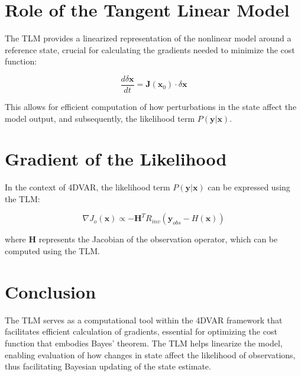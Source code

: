 \documentclass{article}
\begin{document}
\section{Role of the Tangent Linear Model}

The TLM provides a linearized representation of the nonlinear model around a reference state, crucial for calculating the gradients needed to minimize the cost function:

\[
\frac{d \delta \mathbf{x}}{dt} = \mathbf{J}(\mathbf{x}_0) \cdot \delta \mathbf{x}
\]

This allows for efficient computation of how perturbations in the state affect the model output, and subsequently, the likelihood term \( P(\mathbf{y} | \mathbf{x}) \).

\section{Gradient of the Likelihood}

In the context of 4DVAR, the likelihood term \( P(\mathbf{y} | \mathbf{x}) \) can be expressed using the TLM:

\[
\nabla J_o(\mathbf{x}) \propto -\mathbf{H}^T R_{inv} (\mathbf{y}_{obs} - H(\mathbf{x}))
\]

where \( \mathbf{H} \) represents the Jacobian of the observation operator, which can be computed using the TLM.

\section{Conclusion}

The TLM serves as a computational tool within the 4DVAR framework that facilitates efficient calculation of gradients, essential for optimizing the cost function that embodies Bayes' theorem. The TLM helps linearize the model, enabling evaluation of how changes in state affect the likelihood of observations, thus facilitating Bayesian updating of the state estimate.
\end{document}
